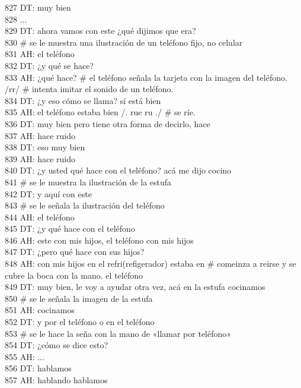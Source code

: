 827 DT: muy bien\\
828 ...\\
829 DT: ahora vamos con este ¿qué dijimos que era?\\
830 # se le muestra una ilustración de un teléfono fijo, no celular\\
831 AH: el teléfono\\
832 DT: ¿y qué se hace?\\
833 AH: ¿qué hace? # el teléfono señala la tarjeta con la imagen del teléfono. /rr/ # intenta imitar el sonido de un teléfono.\\
834 DT: ¿y eso cómo se llama? sí está bien\\
835 AH: el teléfono estaba bien /. rue ru ./ # se ríe.\\
836 DT: muy bien pero tiene otra forma de decirlo, hace\\
837 AH: hace ruido\\
838 DT: eso muy bien\\
839 AH: hace ruido \\
840 DT: ¿y usted qué hace con el teléfono? acá me dijo cocino\\
841 # se le muestra la ilustración de la estufa\\
842 DT: y aquí con este\\
843 # se le señala la ilustración del teléfono\\
844 AH: el teléfono\\
845 DT: ¿y qué hace con el teléfono\\
846 AH: este con mis hijos, el teléfono con mis hijos\\
847 DT: ¿pero qué hace con sus hijos?\\
848 AH: con mis hijos en el refri(refigerador) estaba en # comeinza a reirse y se cubre la boca con la mano. el teléfono\\
849 DT: muy bien, le voy a ayudar otra vez, acá en la estufa cocinamos\\
850 # se le señala la imagen de la estufa\\
851 AH: cocinamos\\
852 DT: y por el teléfono o en el teléfono\\
853 # se le hace la seña con la mano de «llamar por teléfono»\\
854 DT: ¿cómo se dice esto?\\
855 AH: ...\\
856 DT: hablamos\\
857 AH: hablando hablamos\\
